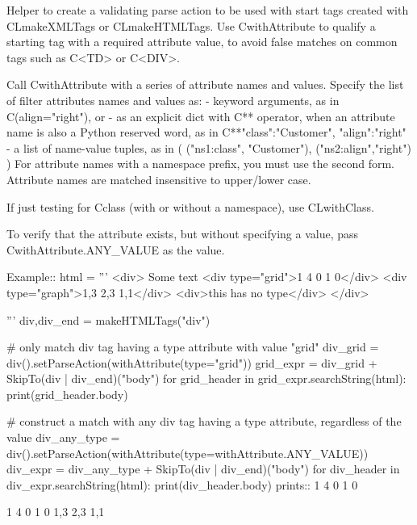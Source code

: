 \begin{DoxyVerb}Helper to create a validating parse action to be used with start tags created
with C{L{makeXMLTags}} or C{L{makeHTMLTags}}. Use C{withAttribute} to qualify a starting tag
with a required attribute value, to avoid false matches on common tags such as
C{<TD>} or C{<DIV>}.

Call C{withAttribute} with a series of attribute names and values. Specify the list
of filter attributes names and values as:
 - keyword arguments, as in C{(align="right")}, or
 - as an explicit dict with C{**} operator, when an attribute name is also a Python
      reserved word, as in C{**{"class":"Customer", "align":"right"}}
 - a list of name-value tuples, as in ( ("ns1:class", "Customer"), ("ns2:align","right") )
For attribute names with a namespace prefix, you must use the second form.  Attribute
names are matched insensitive to upper/lower case.
   
If just testing for C{class} (with or without a namespace), use C{L{withClass}}.

To verify that the attribute exists, but without specifying a value, pass
C{withAttribute.ANY_VALUE} as the value.

Example::
    html = '''
        <div>
        Some text
        <div type="grid">1 4 0 1 0</div>
        <div type="graph">1,3 2,3 1,1</div>
        <div>this has no type</div>
        </div>
            
    '''
    div,div_end = makeHTMLTags("div")

    # only match div tag having a type attribute with value "grid"
    div_grid = div().setParseAction(withAttribute(type="grid"))
    grid_expr = div_grid + SkipTo(div | div_end)("body")
    for grid_header in grid_expr.searchString(html):
        print(grid_header.body)
    
    # construct a match with any div tag having a type attribute, regardless of the value
    div_any_type = div().setParseAction(withAttribute(type=withAttribute.ANY_VALUE))
    div_expr = div_any_type + SkipTo(div | div_end)("body")
    for div_header in div_expr.searchString(html):
        print(div_header.body)
prints::
    1 4 0 1 0

    1 4 0 1 0
    1,3 2,3 1,1
\end{DoxyVerb}
 \mbox{\label{namespacepkg__resources_1_1__vendor_1_1pyparsing_a0ff197897ef382be44395ccc7d995bce}} 
